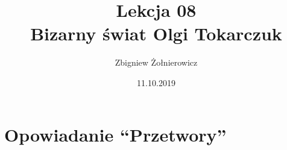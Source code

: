 \documentclass[a4paper]{article}
\begin{document}
\title{{\huge Lekcja 08} \\
{\large Bizarny świat Olgi Tokarczuk}}
\author{Zbigniew Żołnierowicz}
\date{11.10.2019}
\maketitle
\section{Opowiadanie ``Przetwory''}
\end{document}
